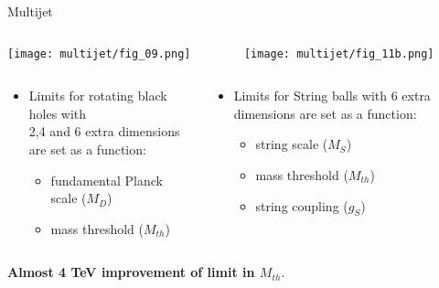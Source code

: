 \documentclass[8pt]{beamer}
\begin{document}
\begin{frame}{\large Multijet}
  \begin{columns}
  \begin{column}{6cm}
   \texttt{[image: multijet/fig\_09.png]}\\
   
  \end{column}
  \begin{column}{6cm}
   \texttt{[image: multijet/fig\_11b.png]}\\
   \end{column}
 \end{columns}
 

  \begin{columns}
  \begin{column}{6cm}
    \begin{itemize}
      \item Limits for rotating black holes with \\2,4 and 6 extra dimensions are set  as a function:
      \begin{itemize}
      \item fundamental Planck scale ($M_D$)
      \item mass threshold ($M_{th}$)
      \end{itemize}
    \end{itemize}
    
  \end{column}
  \begin{column}{6cm}
    \begin{itemize}
      \item Limits for String balls with 6 extra dimensions are set as a function:
      \begin{itemize}
      \item string scale ($M_S$)
      \item mass threshold ($M_{th}$)
      \item string coupling ($g_S$)
      \end{itemize}
    \end{itemize}
  \end{column}
 \end{columns}
 \vspace{0.5cm}
 {\centering
 \textbf{Almost 4 TeV improvement of limit in $M_{th}$}.\\
 }
 
\end{frame}
\end{document}
